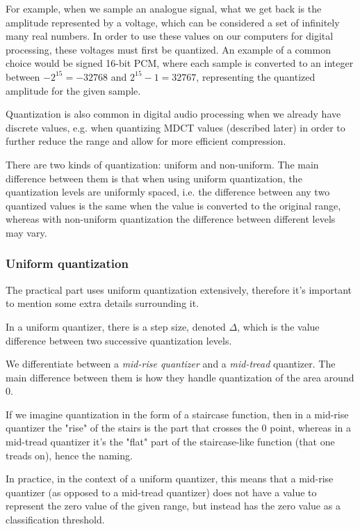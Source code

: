 For example, when we sample an analogue signal, what we get back is the amplitude represented by a voltage, which can be considered a set of infinitely many real numbers. In order to use these values on our computers for digital processing, these voltages must first be quantized. \cite{bosi_goldberg_2003} An example of a common choice would be signed 16-bit PCM, where each sample is converted to an integer between $-2^{15} = -32768$ and $2^{15}-1 = 32767$, representing the quantized amplitude for the given sample.

Quantization is also common in digital audio processing when we already have discrete values, e.g. when quantizing MDCT values (described later) in order to further reduce the range and allow for more efficient compression.

There are two kinds of quantization: uniform and non-uniform. The main difference between them is that when using uniform quantization, the quantization levels are uniformly spaced, i.e. the difference between any two quantized values is the same when the value is converted to the original range, whereas with non-uniform quantization the difference between different levels may vary.

\subsubsection{Uniform quantization}
\label{sec:unif_quant}
The practical part uses uniform quantization extensively, therefore it's important to mention some extra details surrounding it.

In a uniform quantizer, there is a step size, denoted $\Delta$, which is the value difference between two successive quantization levels.

We differentiate between a \emph{mid-rise quantizer} and a \emph{mid-tread} quantizer. The main difference between them is how they handle quantization of the area around $0$. \cite{gersho_1977}

If we imagine quantization in the form of a staircase function, then in a mid-rise quantizer the "rise" of the stairs is the part that crosses the $0$ point, whereas in a mid-tread quantizer it's the "flat" part of the staircase-like function (that one treads on), hence the naming.

In practice, in the context of a uniform quantizer, this means that a mid-rise quantizer (as opposed to a mid-tread quantizer) does not have a value to represent the zero value of the given range, but instead has the zero value as a classification threshold.

